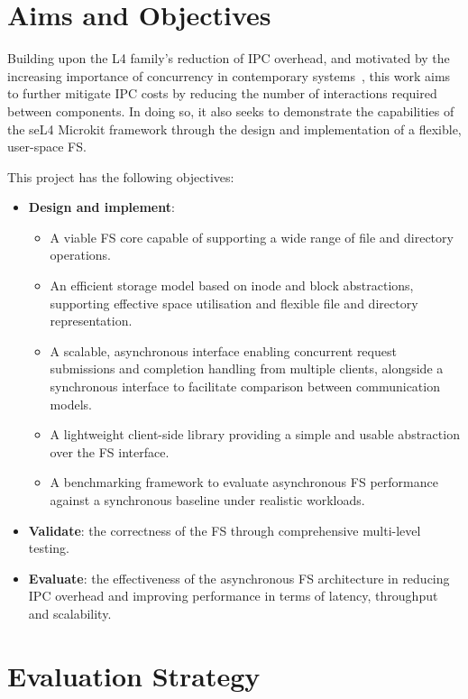 \section{Aims and Objectives}

Building upon the L4 family’s reduction of IPC overhead, and motivated by the increasing importance of concurrency in contemporary systems~\cite{herlihy2020art}, this work aims to further mitigate IPC costs by reducing the number of interactions required between components. In doing so, it also seeks to demonstrate the capabilities of the seL4 Microkit framework through the design and implementation of a flexible, user-space FS.
\newpage

This project has the following objectives:

\begin{itemize}[itemsep=0.2ex, topsep=0.2ex]
    \item \textbf{Design and implement}:
        \begin{itemize}[itemsep=0.2ex, topsep=0.2ex]
            \item A viable FS core capable of supporting a wide range of file and directory operations.
            \item An efficient storage model based on inode and block abstractions, supporting effective space utilisation and flexible file and directory representation.
            \item A scalable, asynchronous interface enabling concurrent request submissions and completion handling from multiple clients, alongside a synchronous interface to facilitate comparison between communication models.
            \item A lightweight client-side library providing a simple and usable abstraction over the FS interface.
            \item A benchmarking framework to evaluate asynchronous FS performance against a synchronous baseline under realistic workloads.
        \end{itemize}
    \item \textbf{Validate}: the correctness of the FS through comprehensive multi-level testing.
    \item \textbf{Evaluate}: the effectiveness of the asynchronous FS architecture in reducing IPC overhead and improving performance in terms of latency, throughput and scalability.
\end{itemize}


\section{Evaluation Strategy}


